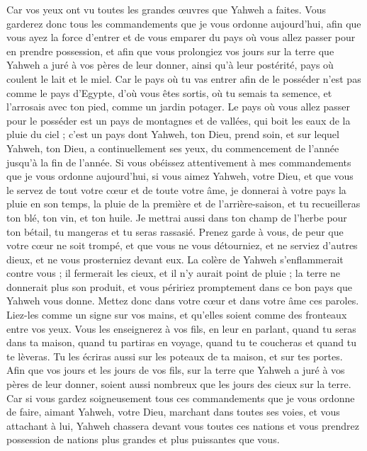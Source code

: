 \begin{multicols}{2}
Car vos yeux ont vu toutes les grandes œuvres que Yahweh a faites.
Vous garderez donc tous les commandements que je vous ordonne aujourd'hui, afin que vous ayez la force d'entrer et de vous emparer du pays où vous allez passer pour en prendre possession,
et afin que vous prolongiez vos jours sur la terre que Yahweh a juré à vos pères de leur donner, ainsi qu'à leur postérité, pays où coulent le lait et le miel.
Car le pays où tu vas entrer afin de le posséder n'est pas comme le pays d'Egypte, d'où vous êtes sortis, où tu semais ta semence, et l'arrosais avec ton pied, comme un jardin potager.
Le pays où vous allez passer pour le posséder est un pays de montagnes et de vallées, qui boit les eaux de la pluie du ciel ;
c'est un pays dont Yahweh, ton Dieu, prend soin, et sur lequel Yahweh, ton Dieu, a continuellement ses yeux, du commencement de l'année jusqu'à la fin de l'année.
Si vous obéissez attentivement à mes commandements que je vous ordonne aujourd'hui, si vous aimez Yahweh, votre Dieu, et que vous le servez de tout votre cœur et de toute votre âme,
je donnerai à votre pays la pluie en son temps, la pluie de la première et de l'arrière-saison, et tu recueilleras ton blé, ton vin, et ton huile.
Je mettrai aussi dans ton champ de l'herbe pour ton bétail, tu mangeras et tu seras rassasié.
Prenez garde à vous, de peur que votre cœur ne soit trompé, et que vous ne vous détourniez, et ne serviez d'autres dieux, et ne vous prosterniez devant eux.
La colère de Yahweh s'enflammerait contre vous ; il fermerait les cieux, et il n'y aurait point de pluie ; la terre ne donnerait plus son produit, et vous péririez promptement dans ce bon pays que Yahweh vous donne.
Mettez donc dans votre cœur et dans votre âme ces paroles. Liez-les comme un signe sur vos mains, et qu'elles soient comme des fronteaux entre vos yeux.
Vous les enseignerez à vos fils, en leur en parlant, quand tu seras dans ta maison, quand tu partiras en voyage, quand tu te coucheras et quand tu te lèveras.
Tu les écriras aussi sur les poteaux de ta maison, et sur tes portes.
Afin que vos jours et les jours de vos fils, sur la terre que Yahweh a juré à vos pères de leur donner, soient aussi nombreux que les jours des cieux sur la terre.
Car si vous gardez soigneusement tous ces commandements que je vous ordonne de faire, aimant Yahweh, votre Dieu, marchant dans toutes ses voies, et vous attachant à lui,
Yahweh chassera devant vous toutes ces nations et vous prendrez possession de nations plus grandes et plus puissantes que vous.

\end{multicols}
